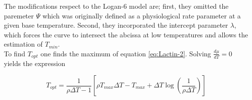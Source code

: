 \documentclass[titlepage,11pt]{article}
\begin{document}
\begin{linenumbers}
		The modifications respect to the Logan-6 model are; first, they omitted the paremeter $ \Psi $ which was originally defined as a physiological rate parameter at a given base temperature. Second, they incorporated the intercept parameter $ \lambda $, which forces the curve to intersect the abcissa at low temperatures and allows the estimation of $ T_{min} $.\\
		To find $ T_{opt} $ one finds the maximum of equation \ref{eq:Lactin-2}. Solving $ \frac{d\mu}{dT}  = 0$ yields the expression
		\begin{linenomath*}
			\begin{equation}\label{eq:Topt}
			T_{opt} = \frac{1}{\rho\Delta T  -1}\left[\rho T_{max} \Delta T - T_{max} + \Delta T \log\left(\frac{1}{\rho\Delta T }\right) \right]
			\end{equation}
		\end{linenomath*}
	\end{linenumbers}
	
	\newpage
	
	
\end{document}
